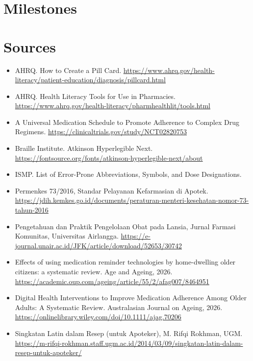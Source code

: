 \documentclass[11pt]{article}
\begin{document}
\section{Milestones}
\begin{center}
\end{center}

\section{Sources}
\begin{itemize}\small
  \item AHRQ. How to Create a Pill Card. \url{https://www.ahrq.gov/health-literacy/patient-education/diagnosis/pillcard.html}
  \item AHRQ. Health Literacy Tools for Use in Pharmacies. \url{https://www.ahrq.gov/health-literacy/pharmhealthlit/tools.html}
  \item A Universal Medication Schedule to Promote Adherence to Complex Drug Regimens. \url{https://clinicaltrials.gov/study/NCT02820753}
  \item Braille Institute. Atkinson Hyperlegible Next. \url{https://fontsource.org/fonts/atkinson-hyperlegible-next/about}
  \item ISMP. List of Error-Prone Abbreviations, Symbols, and Dose Designations.
  \item Permenkes 73/2016, Standar Pelayanan Kefarmasian di Apotek. \url{https://jdih.kemkes.go.id/documents/peraturan-menteri-kesehatan-nomor-73-tahun-2016}
  \item Pengetahuan dan Praktik Pengelolaan Obat pada Lansia, Jurnal Farmasi Komunitas, Universitas Airlangga. \url{https://e-journal.unair.ac.id/JFK/article/download/52653/30742}
  \item Effects of using medication reminder technologies by home-dwelling older citizens: a systematic review. Age and Ageing, 2026. \url{https://academic.oup.com/ageing/article/55/2/afag007/8464951}
  \item Digital Health Interventions to Improve Medication Adherence Among Older Adults: A Systematic Review. Australasian Journal on Ageing, 2026. \url{https://onlinelibrary.wiley.com/doi/10.1111/ajag.70206}
  \item Singkatan Latin dalam Resep (untuk Apoteker), M. Rifqi Rokhman, UGM. \url{https://m-rifqi-rokhman.staff.ugm.ac.id/2014/03/09/singkatan-latin-dalam-resep-untuk-apoteker/}
\end{itemize}
\end{document}
